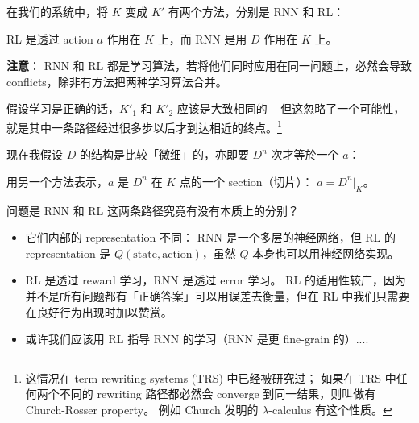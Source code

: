 \documentclass[12pt]{article}
\begin{document}
在我们的系统中，将 $K$ 变成 $K'$ 有两个方法，分别是 RNN 和 RL：\par
\begin{figure}[H]
\centering
{}
\end{figure}
RL 是透过 action $a$ 作用在 $K$ 上，而 RNN 是用 $D$ 作用在 $K$ 上。

\textbf{注意}： RNN 和 RL 都是学习算法，若将他们同时应用在同一问题上，必然会导致 conflicts，除非有方法把两种学习算法合并。

假设学习是正确的话，$K'_1$ 和 $K'_2$ 应该是大致相同的 \textemdash~ 但这忽略了一个可能性，就是其中一条路径经过很多步以后才到达相近的终点。\footnote{这情况在 term rewriting systems (TRS) 中已经被研究过； 如果在 TRS 中任何两个不同的 rewriting 路径都必然会 converge 到同一结果，则叫做有 Church-Rosser property。 例如 Church 发明的 $\lambda$-calculus 有这个性质。} 

现在我假设 $D$ 的结构是比较「微细」的，亦即要 $D^n$ 次才等於一个 $a$：
\begin{figure}[H]
\centering
{}
\end{figure}
用另一个方法表示，$a$ 是 $D^n$ 在 $K$ 点的一个 section（切片）： $a = D^n|_K$。

问题是 RNN 和 RL 这两条路径究竟有没有本质上的分别？
\begin{itemize}
\item 它们内部的 representation 不同： RNN 是一个多层的神经网络，但 RL 的 representation 是 $Q(\mbox{state},\mbox{action})$，虽然 $Q$ 本身也可以用神经网络实现。
\item RL 是透过 reward 学习，RNN 是透过 error 学习。 RL 的适用性较广，因为并不是所有问题都有「正确答案」可以用误差去衡量，但在 RL 中我们只需要在良好行为出现时加以赞赏。
\item 或许我们应该用 RL 指导 RNN 的学习（RNN 是更 fine-grain 的）....
\end{itemize}
\end{document}
